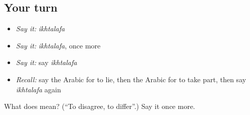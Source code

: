 \subsection*{Your turn}
\begin{itemize}
\raggedright
  \item \emph{Say it:} \emph{ikhtalafa}
  \item \emph{Say it:} \emph{ikhtalafa}, once more
  \item \emph{Say it:} say \emph{ikhtalafa}
  \item \emph{Recall:} say the Arabic for to lie, then the Arabic for to take part, then say \emph{ikhtalafa} again
\end{itemize}

\begin{tcolorbox}[breakable,colback=teal!4,colframe=teal!35!black,title={Before you move on}]
What does  mean? (\textquotedblleft{}To disagree, to differ\textquotedblright{}.) Say it once more.
\end{tcolorbox}
